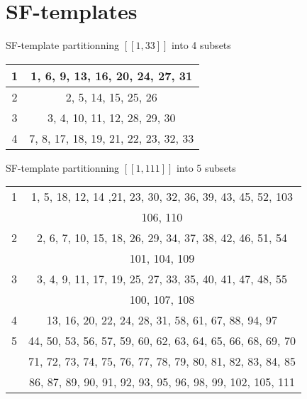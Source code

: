 \appendix
\renewcommand{\arraystretch}{1}


\section{SF-templates}

\begin{center}
SF-template partitionning \([\![1, 33]\!]\) into 4 subsets \\
\begin{tabular}{|*{2}{c|}}
	\hline
	1 & 1, 6, 9, 13, 16, 20, 24, 27, 31 \\
	\hline
	2 & 2, 5, 14, 15, 25, 26 \\
	\hline
	3 & 3, 4, 10, 11, 12, 28, 29, 30 \\
	\hline
	4 & 7, 8, 17, 18, 19, 21, 22, 23, 32, 33 \\
	\hline
\end{tabular}
\end{center}

\begin{center}
SF-template partitionning \([\![1, 111]\!]\) into 5 subsets
\begin{tabular}{|*{2}{c|}}
	\hline
	1 & 1, 5, 18, 12, 14 ,21, 23, 30, 32, 36, 39, 43, 45, 52, 103 \\
	 & 106, 110 \\
	\hline
	2 & 2, 6, 7, 10, 15, 18, 26, 29, 34, 37, 38, 42, 46, 51, 54 \\
	& 101, 104, 109 \\
	\hline
	3 & 3, 4, 9, 11, 17, 19, 25, 27, 33, 35, 40, 41, 47, 48, 55 \\
	& 100, 107, 108 \\
	\hline
	4 & 13, 16, 20, 22, 24, 28, 31, 58, 61, 67, 88, 94, 97 \\
	\hline
	5 & 44, 50, 53, 56, 57, 59, 60, 62, 63, 64, 65, 66, 68, 69, 70\\
	& 71, 72, 73, 74, 75, 76, 77, 78, 79, 80, 81, 82, 83, 84, 85\\
	& 86, 87, 89, 90, 91, 92, 93, 95, 96, 98, 99, 102, 105, 111 \\
	\hline
\end{tabular}
\end{center}

